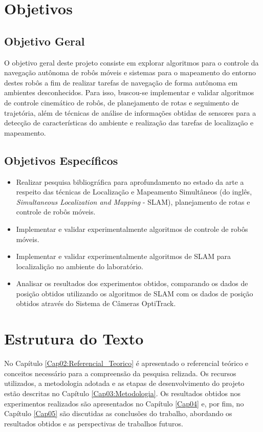\section{Objetivos}

\subsection{Objetivo Geral}

O objetivo geral deste projeto consiste em explorar algoritmos para o controle da navegação autônoma de robôs móveis e sistemas para o mapeamento do entorno destes robôs a fim de realizar tarefas de navegação de forma autônoma em ambientes desconhecidos. Para isso, buscou-se implementar e validar algoritmos de controle cinemático de robôs, de planejamento de rotas e seguimento de trajetória, além de técnicas de análise de informações obtidas de sensores para a detecção de características do ambiente e realização das tarefas de localização e mapeamento.

\subsection{Objetivos Específicos}

\begin{itemize}
\item
Realizar pesquisa bibliográfica para aprofundamento no estado da arte a respeito das técnicas de Localização e Mapeamento Simultâneos (do inglês, \textit{Simultaneous Localization and Mapping} - SLAM), planejamento de rotas e controle de robôs móveis.
\item
Implementar e validar experimentalmente algoritmos de controle de robôs móveis.
\item
Implementar e validar experimentalmente algoritmos de SLAM para localizalição no ambiente do laboratório.
\item
Analisar os resultados dos experimentos obtidos, comparando os dados de posição obtidos utilizando os algoritmos de SLAM com os dados de posição obtidos através do Sistema de Câmeras OptiTrack.
\end{itemize}

\section{Estrutura do Texto}

No Capítulo \ref{Cap02:Referencial_Teorico} é apresentado o referencial teórico e conceitos necessário para a compreensão da pesquisa relizada. Os recursos utilizados, a metodologia adotada e as etapas de desenvolvimento do projeto estão descritas no Capítulo \ref{Cap03:Metodologia}. Os resultados obtidos nos experimentos realizados são apresentados no Capítulo \ref{Cap04} e, por fim, no Capítulo \ref{Cap05} são discutidas as conclusões do trabalho, abordando os resultados obtidos e as perspectivas de trabalhos futuros.